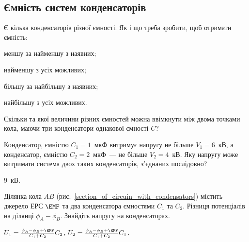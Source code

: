 \subsection*{Ємність систем конденсаторів}

\begin{problem}
    Є кілька конденсаторів різної ємності. Як і що треба зробити, щоб отримати ємність:
	\begin{enumerate*}[label=\alph*)]
		\item меншу за найменшу з наявних;
		\item найменшу з усіх можливих;
		\item більшу за найбільшу з наявних;
		\item найбільшу з усіх можливих.
	\end{enumerate*}
\end{problem}

\begin{problem}
    Скільки та якої величини різних ємностей можна ввімкнути між двома точками кола, маючи три конденсатори однакової ємності $C$?
\end{problem}

\begin{problem}
    Конденсатор, ємністю $C_1 = 1$~мкФ витримує напругу не більше $V_1 = 6$~кВ, а конденсатор, ємністю $C_2 = 2$~мкФ~--- не більше $V_2 = 4$~кВ. Яку напругу може витримати система двох таких конденсаторів, з'єднаних послідовно?
\begin{solution}
	$9$~кВ.
\end{solution}
\end{problem}

\begin{problem}\label{prb:section_of_circuin_with_condensators}
    Ділянка кола $AB$ (рис.~\ref{section_of_circuin_with_condensators}) містить джерело ЕРС $\EMF$ та два конденсатора ємностями $C_1$ та $C_2$. Різниця потенціалів на ділянці $\phi_A - \phi_B$. Знайдіть напругу на конденсаторах.
\begin{solution}
	$U_1 = \frac{\phi_A - \phi_B + \EMF}{C_1 + C_2} C_2$,
	$U_2 = \frac{\phi_A - \phi_B + \EMF}{C_1 + C_2} C_1$.
\end{solution}
\end{problem}

